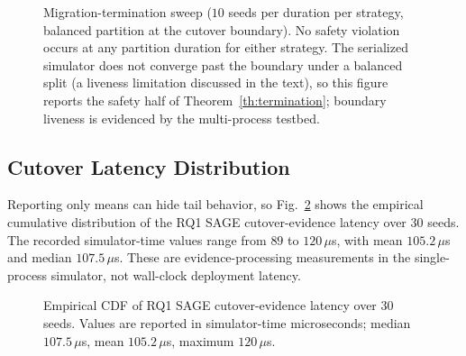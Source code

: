 \documentclass[journal]{IEEEtran}
\begin{document}
\begin{figure}[t]
\centering
{}
\caption{Migration-termination sweep ($10$ seeds per duration per strategy, balanced
partition at the cutover boundary). No safety violation occurs at any partition duration for
either strategy. The serialized simulator does not converge past the boundary under a balanced
split (a liveness limitation discussed in the text), so this figure reports the safety half of
Theorem~\ref{th:termination}; boundary liveness is evidenced by the multi-process testbed.}
\label{fig:termination}
\end{figure}

\subsection{Cutover Latency Distribution}
Reporting only means can hide tail behavior, so Fig.~\ref{fig:cdf} shows the empirical
cumulative distribution of the RQ1 SAGE cutover-evidence latency over $30$ seeds. The
recorded simulator-time values range from $89$ to $120\,\mu$s, with mean $105.2\,\mu$s and median
$107.5\,\mu$s. These are evidence-processing measurements in the
single-process simulator, not wall-clock deployment latency.

\begin{figure}[t]
\centering
{}
\caption{Empirical CDF of RQ1 SAGE cutover-evidence latency over $30$ seeds. Values are
reported in simulator-time microseconds; median $107.5\,\mu$s, mean $105.2\,\mu$s, maximum
$120\,\mu$s.}
\label{fig:cdf}
\end{figure}
\end{document}
